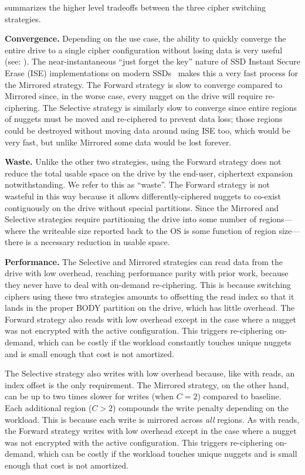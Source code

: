  summarizes the higher level tradeoffs between the
three cipher switching strategies.

\textbf{Convergence.} Depending on the use case, the ability to quickly converge
the entire drive to a single cipher configuration without losing data is very
useful (see: ). The near-instantaneous ``just forget the key''
nature of SSD Instant Secure Erase (ISE) implementations on modern
SSDs~\cite{ISE1,ISE2,ISE3} makes this a very fast process for the Mirrored
strategy. The Forward strategy is slow to converge compared to Mirrored since,
in the worse case, every nugget on the drive will require re-ciphering. The
Selective strategy is similarly slow to converge since entire regions of nuggets
must be moved and re-ciphered to prevent data loss; those regions could be
destroyed without moving data around using ISE too, which would be very fast,
but unlike Mirrored some data would be lost forever.

\textbf{Waste.} Unlike the other two strategies, using the Forward strategy does
not reduce the total usable space on the drive by the end-user, ciphertext
expansion notwithstanding. We refer to this as ``waste''. The Forward strategy
is not wasteful in this way because it allows differently-ciphered nuggets to
co-exist contiguously on the drive without special partitions. Since the
Mirrored and Selective strategies require partitioning the drive into some
number of regions---where the writeable size reported back to the OS is some
function of region size---there is a necessary reduction in usable space.

\textbf{Performance.} The Selective and Mirrored strategies can read data from
the drive with low overhead, reaching performance parity with prior work,
because they never have to deal with on-demand re-ciphering. This is because
switching ciphers using these two strategies amounts to offsetting the read
index so that it lands in the proper BODY partition on the drive, which has
little overhead. The Forward strategy also reads with low overhead except in the
case where a nugget was not encrypted with the active configuration. This
triggers re-ciphering on-demand, which can be costly if the workload constantly
touches unique nuggets and is small enough that cost is not amortized.

The Selective strategy also writes with low overhead because, like with reads,
an index offset is the only requirement. The Mirrored strategy, on the other
hand, can be up to two times slower for writes (when $C = 2$) compared to
baseline. Each additional region ($C > 2$) compounds the write penalty depending
on the workload. This is because each write is mirrored across \emph{all}
regions. As with reads, the Forward strategy writes with low overhead except in
the case where a nugget was not encrypted with the active configuration. This
triggers re-ciphering on-demand, which can be costly if the workload touches
unique nuggets and is small enough that cost is not amortized.\\

